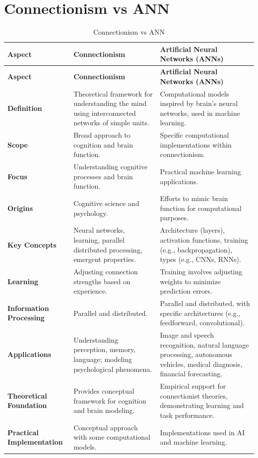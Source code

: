 \section{Connectionism vs ANN \cite{chatgpt,arxiv-2405.04048}}\label{connectionism vs ann}
\begin{longtable}{|>{\raggedright\arraybackslash}p{3cm}|>{\raggedright\arraybackslash}p{6cm}|>{\raggedright\arraybackslash}p{6cm}|}
\caption{Connectionism vs ANN} \\
\hline
\textbf{Aspect} & \textbf{Connectionism} & \textbf{Artificial Neural Networks (ANNs)} \\
\hline
\endfirsthead
\hline
\textbf{Aspect} & \textbf{Connectionism} & \textbf{Artificial Neural Networks (ANNs)} \\
\hline
\endhead
\hline
\endfoot
\hline
\endlastfoot
\textbf{Definition} & Theoretical framework for understanding the mind using interconnected networks of simple units. & Computational models inspired by brain's neural networks, used in machine learning. \\
\hline
\textbf{Scope} & Broad approach to cognition and brain function. & Specific computational implementations within connectionism. \\
\hline
\textbf{Focus} & Understanding cognitive processes and brain function. & Practical machine learning applications. \\
\hline
\textbf{Origins} & Cognitive science and psychology. & Efforts to mimic brain function for computational purposes. \\
\hline
\textbf{Key Concepts} & Neural networks, learning, parallel distributed processing, emergent properties. & Architecture (layers), activation functions, training (e.g., backpropagation), types (e.g., CNNs, RNNs). \\
\hline
\textbf{Learning} & Adjusting connection strengths based on experience. & Training involves adjusting weights to minimize prediction errors. \\
\hline
\textbf{Information Processing} & Parallel and distributed. & Parallel and distributed, with specific architectures (e.g., feedforward, convolutional). \\
\hline
\textbf{Applications} & Understanding perception, memory, language; modeling psychological phenomena. & Image and speech recognition, natural language processing, autonomous vehicles, medical diagnosis, financial forecasting. \\
\hline
\textbf{Theoretical Foundation} & Provides conceptual framework for cognition and brain modeling. & Empirical support for connectionist theories, demonstrating learning and task performance. \\
\hline
\textbf{Practical Implementation} & Conceptual approach with some computational models. & Implementations used in AI and machine learning. \\
\hline
\end{longtable}

